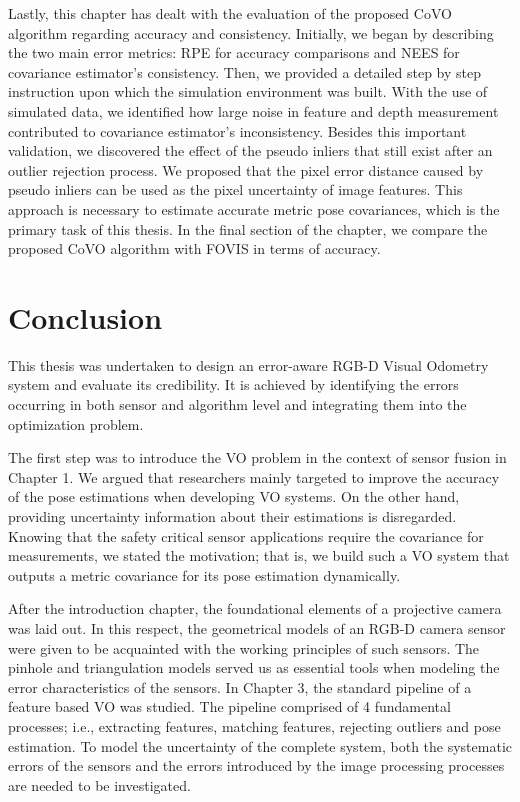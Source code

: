 \documentclass[a4paper]{report}
\numberwithin{figure}{section}
\begin{document}
Lastly, this chapter has dealt with the evaluation of the proposed CoVO algorithm
regarding accuracy and consistency. Initially, we began by describing the two
main error metrics: RPE for accuracy comparisons and NEES for covariance
estimator's consistency.  Then, we provided a detailed step by step instruction
upon which the simulation environment was built. With the use of simulated
data, we identified how large noise in feature and depth measurement
contributed to covariance estimator's inconsistency. Besides this important
validation, we discovered the effect of the pseudo inliers that still exist
after an outlier rejection process. We proposed that the pixel error distance
caused by pseudo inliers can be used as the pixel uncertainty of image
features. This approach is necessary to estimate accurate metric pose covariances, which
is the primary task of this thesis.  In the final section of the chapter, we
compare the proposed CoVO algorithm with FOVIS in terms of accuracy.

\chapter{Conclusion} \label{cp_conc}

This thesis was undertaken to design an error-aware RGB-D Visual Odometry
system and evaluate its credibility.  It is achieved by identifying the errors
occurring in both sensor and algorithm level and integrating them into the
optimization problem.

The first step was to introduce the VO problem in the context of sensor fusion
in Chapter 1. We argued that researchers mainly targeted to improve the
accuracy of the pose estimations when developing VO systems.  On the other
hand, providing uncertainty information about their estimations is disregarded.
Knowing that the safety critical sensor applications require the covariance for
measurements, we stated the motivation; that is, we build such a VO system that
outputs a metric covariance for its pose estimation dynamically. 

After the introduction chapter, the foundational elements of a projective
camera was laid out. 
In this respect, the geometrical models of an RGB-D camera sensor were given to
be acquainted with the working principles of such sensors.  The pinhole and
triangulation models served us as essential tools when modeling the error
characteristics of the sensors.
In Chapter 3, the standard pipeline of a feature based VO was studied. The
pipeline comprised of 4 fundamental processes; i.e., extracting features,
matching features, rejecting outliers and pose estimation. To model the
uncertainty of the complete system, both the systematic errors of the
sensors and the errors introduced by the image processing processes are
needed to be investigated.
\end{document}
